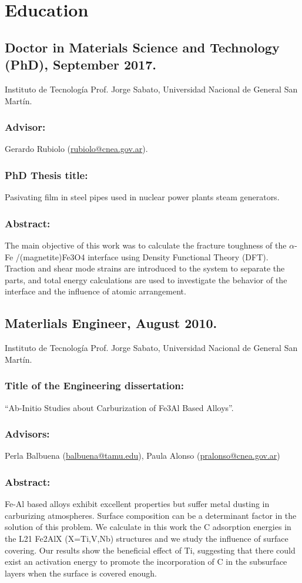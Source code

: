 \section{Education}

\subsection{Doctor in Materials Science and Technology (PhD), September 2017.} Instituto de
Tecnología Prof. Jorge Sabato, Universidad Nacional de General San Martín. \subsubsection{Advisor:}
Gerardo Rubiolo (\url{rubiolo@cnea.gov.ar}).
\subsubsection{PhD Thesis title:} Pasivating film in steel pipes used in nuclear power plants steam
generators.
\subsubsection{Abstract:} The main objective of this work was to calculate the fracture toughness of the $\alpha$-Fe /(magnetite)Fe3O4 interface using Density Functional Theory (DFT). Traction and
shear mode strains are introduced to the system to separate the parts, and total energy
calculations are used to investigate the behavior of the interface and the influence of
atomic arrangement.

\subsection{Materlials Engineer, August 2010.} Instituto de Tecnología Prof. Jorge Sabato,
Universidad Nacional de General San Martín.
\subsubsection{Title of the Engineering dissertation:} “Ab-Initio Studies about Carburization of Fe3Al Based Alloys”.
\subsubsection{Advisors:} Perla Balbuena (\url{balbuena@tamu.edu}), Paula Alonso (\url{pralonso@cnea.gov.ar})
\subsubsection{Abstract:} Fe-Al based alloys exhibit excellent properties but suffer metal dusting in
carburizing atmospheres. Surface composition can be a determinant factor in the solution
of this problem. We calculate in this work the C adsorption energies in the L21 Fe2AlX
(X=Ti,V,Nb) structures and we study the influence of surface covering. Our results show
the beneficial effect of Ti, suggesting that there could exist an activation energy to promote
the incorporation of C in the subsurface layers when the surface is covered enough.

